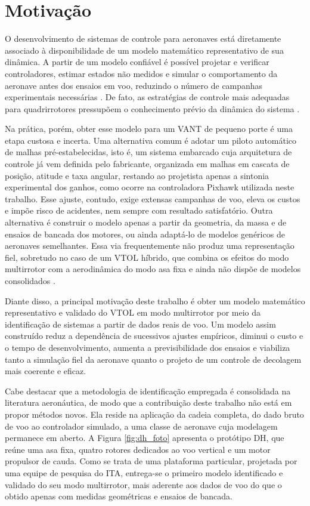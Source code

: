 \section{Motivação}\label{sec:motivacao}
O desenvolvimento de sistemas de controle para aeronaves está diretamente associado à disponibilidade de um modelo matemático representativo de sua dinâmica. A partir de um modelo confiável é possível projetar e verificar controladores, estimar estados não medidos e simular o comportamento da aeronave antes dos ensaios em voo, reduzindo o número de campanhas experimentais necessárias \cite{Aguirre2015}. De fato, as estratégias de controle mais adequadas para quadrirrotores pressupõem o conhecimento prévio da dinâmica do sistema \cite{Quan2017}.

Na prática, porém, obter esse modelo para um \gls{VANT} de pequeno porte é uma etapa custosa e incerta. Uma alternativa comum é adotar um piloto automático de malhas pré-estabelecidas, isto é, um sistema embarcado cuja arquitetura de controle já vem definida pelo fabricante, organizada em malhas em cascata de posição, atitude e taxa angular, restando ao projetista apenas a sintonia experimental dos ganhos, como ocorre na controladora Pixhawk utilizada neste trabalho. Esse ajuste, contudo, exige extensas campanhas de voo, eleva os custos e impõe risco de acidentes, nem sempre com resultado satisfatório. Outra alternativa é construir o modelo apenas a partir da geometria, da massa e de ensaios de bancada dos motores, ou ainda adaptá-lo de modelos genéricos de aeronaves semelhantes. Essa via frequentemente não produz uma representação fiel, sobretudo no caso de um \gls{VTOL} híbrido, que combina os efeitos do modo multirrotor com a aerodinâmica do modo asa fixa e ainda não dispõe de modelos consolidados \cite{Saeed2018, Graesdal2021}.

Diante disso, a principal motivação deste trabalho é obter um modelo matemático representativo e validado do \gls{VTOL} em modo multirrotor por meio da identificação de sistemas a partir de dados reais de voo. Um modelo assim construído reduz a dependência de sucessivos ajustes empíricos, diminui o custo e o tempo de desenvolvimento, aumenta a previsibilidade dos ensaios e viabiliza tanto a simulação fiel da aeronave quanto o projeto de um controle de decolagem mais coerente e eficaz.

Cabe destacar que a metodologia de identificação empregada é consolidada na literatura aeronáutica, de modo que a contribuição deste trabalho não está em propor métodos novos. Ela reside na aplicação da cadeia completa, do dado bruto de voo ao controlador simulado, a uma classe de aeronave cuja modelagem permanece em aberto. A Figura \ref{fig:dh_foto} apresenta o protótipo \gls{DH}, que reúne uma asa fixa, quatro rotores dedicados ao voo vertical e um motor propulsor de cauda. Como se trata de uma plataforma particular, projetada por uma equipe de pesquisa do ITA, entrega-se o primeiro modelo identificado e validado do seu modo multirrotor, mais aderente aos dados de voo do que o obtido apenas com medidas geométricas e ensaios de bancada.

